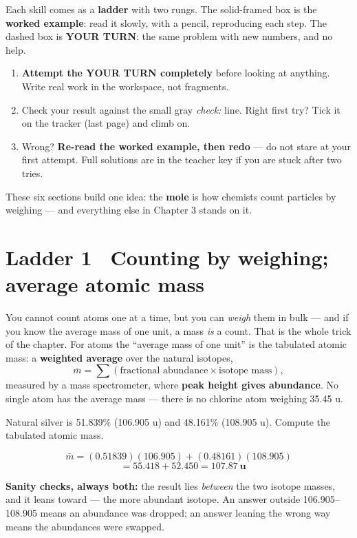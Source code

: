 \documentclass{apchem-worksheet}
\begin{document}
\apctitleblock

\begin{apcnote}
Each skill comes as a \textbf{ladder} with two rungs. The solid-framed box
is the \textbf{worked example}: read it slowly, with a pencil, reproducing
each step. The dashed box is \textbf{YOUR TURN}: the same problem with new
numbers, and no help.

\begin{enumerate}[leftmargin=*,itemsep=0.15em]
  \item \textbf{Attempt the YOUR TURN completely} before looking at
        anything. Write real work in the workspace, not fragments.
  \item Check your result against the small gray \emph{check:} line. Right
        first try? Tick it on the tracker (last page) and climb on.
  \item Wrong? \textbf{Re-read the worked example, then redo} --- do not
        stare at your first attempt. Full solutions are in the teacher key
        if you are stuck after two tries.
\end{enumerate}
These six sections build one idea: the \textbf{mole} is how chemists count
particles by weighing --- and everything else in Chapter 3 stands on it.
\end{apcnote}

\section*{\sffamily Ladder 1 \textbullet\ Counting by weighing; average
atomic mass}

You cannot count atoms one at a time, but you can \emph{weigh} them in
bulk --- and if you know the average mass of one unit, a mass \emph{is} a
count. That is the whole trick of the chapter. For atoms the ``average
mass of one unit'' is the tabulated atomic mass: a
\textbf{weighted average} over the natural isotopes,
\[ \bar m = \sum (\text{fractional abundance} \times \text{isotope mass}), \]
measured by a mass spectrometer, where \textbf{peak height gives
abundance}. No single atom has the average mass --- there is no chlorine
atom weighing 35.45 u.

\begin{workedexample}
Natural silver is 51.839\%  (106.905 u) and 48.161\%
 (108.905 u). Compute the tabulated atomic mass.

\[ \bar m = (0.51839)(106.905) + (0.48161)(108.905) \]
\[ \phantom{\bar m} = 55.418 + 52.450 = \mathbf{107.87~u} \]

\textbf{Sanity checks, always both:} the result lies \emph{between} the
two isotope masses, and it leans toward  --- the more
abundant isotope. An answer outside 106.905--108.905 means an abundance
was dropped; an answer leaning the wrong way means the abundances were
swapped.
\end{workedexample}
\end{document}
